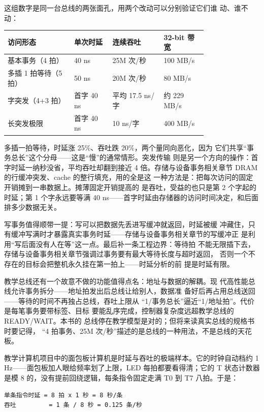 这组数字是同一台总线的两张面孔，用两个改动可以分别验证它们谁
动、谁不动：

\begin{longtable}{L{0.26\linewidth}L{0.15\linewidth}L{0.2\linewidth}L{0.17\linewidth}}
\toprule
访问形态 & 单次时延 & 连续吞吐 & 32-bit 带宽 \\
\midrule
基本事务（4 拍） & 40 ns & 25M 次/秒 & 100 MB/s \\\tablerowrule
多插 1 拍等待（5 拍） & 50 ns & 20M 次/秒 & 80 MB/s \\ 字突发（4+3 拍） & 首字 40 ns & 平均 17.5 ns/字 & 约 229 MB/s \\\tablerowrule
长突发极限 & 首字 40 ns & 10 ns/字 & 400 MB/s \\
\bottomrule
\end{longtable}

多插一拍等待，时延涨 25\%、吞吐跌 20\%，两个量同向恶化，因为
它们共享“事务总长”这个分母——这是“慢”的通常情形。突发传输
则是另一个方向的操作：首字时延一纳秒没省，平均吞吐却翻到接近
4 倍。存储与设备事务相关章节 DRAM 的行缓冲突发、cache 的整行填充，用的全是这
一种方法是：把每次访问的固定开销摊到一串数据上。摊薄固定开销提高的
是吞吐，受益的也只是第 2 个字起的时延；第 1 个字永远要等满 40
ns——首字时延由存储器的访问时间决定，和后面排多少数据无关。

写事务值得顺带一提：写可以把数据先丢进写缓冲就返回，时延被缓
冲藏住，只有缓冲写满时才暴露真实事务时延——存储与设备事务相关章节的写缓冲正
是利用“写后面没有人在等”这一点。最后补一条工程边界：等待拍
不能无限插下去，存储与设备事务相关章节强调过事务要有最大等待长度与超时返回，
否则一个不存在的目标会把整机永久挂在第一拍上——时延分析的前
提是时延有限。

教学总线还有一个故意不做的功能值得点名：地址与数据的解耦。现
代高性能总线允许事务拆分——地址拍发出后总线让给别人，数据准
备好后再占用总线送回——等待的时间不再独占总线，吞吐上限从
“1/事务总长”逼近“1/地址拍”。代价是每笔事务要带标签、目标
要能乱序完成，控制器复杂度远超教学总线的 READY/WAIT。本书的
总线停在教学模型是对的；但将来读真实总线的规格书时要记得，
“4 拍事务、25M 次/秒”描述的是总线的一种用法，不是总线的天花
板。

教学计算机项目中的面包板计算机是时延与吞吐的极端样本。它的时钟自动档约
1 Hz——面包板加人眼给频率划了上限，LED 每拍都要看得清；它的
T 状态计数器是模 8 的，没有提前回绕逻辑，每条指令固定走满 T0
到 T7 八拍。于是：

\begin{lstlisting}
单条指令时延 = 8 拍 x 1 秒 = 8 秒/条
吞吐         = 1 条 / 8 秒 = 0.125 条/秒
\end{lstlisting}

